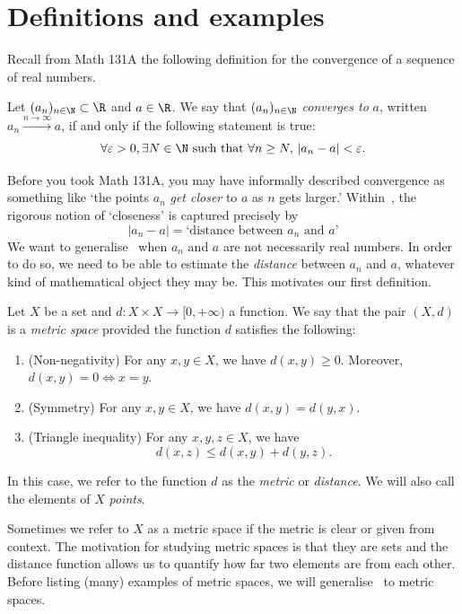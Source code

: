 \section{Definitions and examples}
\label{sec:1_1_defn}
Recall from Math 131A the following definition for the convergence of a sequence of real numbers.
\begin{defn}
	\label{defn:cvg_real}
	Let $(a_n)_{n\in\N}\subset \R$ and $a\in \R$. We say that $(a_n)_{n\in\N}$ \textit{converges to }$a$, written $a_n\overset{n\to \infty}{\to}a$, if and only if the following statement is true:
	\[
	\forall \varepsilon>0,\exists N\in\N\text{ such that }\forall n\ge N, \, |a_n - a|<\varepsilon.
	\]
\end{defn}
Before you took Math 131A, you may have informally described convergence as something like `the points $a_n$ \textit{get closer} to $a$ as $n$ gets larger.' Within~, the rigorous notion of `closeness' is captured precisely by
\[
|a_n-a| = \text{`distance between }a_n\text{ and }a\text{'}
\]
We want to generalise~ when $a_n$ and $a$ are not necessarily real numbers. In order to do so, we need to be able to estimate the \textit{distance} between $a_n$ and $a$, whatever kind of mathematical object they may be. This motivates our first definition.
\begin{defn}
	\label{defn:metric}
	Let $X$ be a set and $d:X\times X \to [0,+\infty)$ a function. We say that the pair $(X,d)$ is a \textit{metric space} provided the function $d$ satisfies the following:
	\begin{enumerate}[label = \textbf{M\arabic*)}]
		\item (Non-negativity) For any $x,y\in X$, we have $d(x,y)\ge 0$. Moreover, $d(x,y) = 0 \iff x=y$. \label{m:pos}
		\item (Symmetry) For any $x,y\in X$, we have $d(x,y) = d(y,x)$. \label{m:sym}
		\item (Triangle inequality) For any $x,y,z\in X$, we have
		\[
		d(x,z) \le d(x,y) + d(y,z).
		\]
		\label{m:tri}
	\end{enumerate}
	In this case, we refer to the function $d$ as the \textit{metric} or \textit{distance}. We will also call the elements of $X$ \textit{points}.
\end{defn}
Sometimes we refer to $X$ as a metric space if the metric is clear or given from context. The motivation for studying metric spaces is that they are sets and the distance function allows us to quantify how far two elements are from each other. Before listing (many) examples of metric spaces, we will generalise~ to metric spaces.
